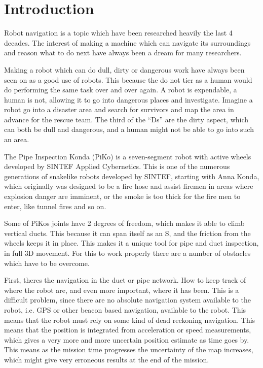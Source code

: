 
\chapter{Introduction}
Robot navigation is a topic which have been researched heavily the last 4 decades. The
interest of making a machine which can navigate its surroundings and reason what to do
next have always been a dream for many researchers. 

Making a robot which can do dull, dirty  or dangerous work have always been seen on as a
good use of robots. This because the do not tier as a human would do performing the same
task over and over again. A robot is expendable, a human is not, allowing it to go into
dangerous places and investigate. Imagine a robot go into a disaster area and search for
survivors and map the area in advance for the rescue team. The third of the ``Ds'' are the
dirty aspect, which can both be dull and dangerous, and a human might not be able to go
into such an area. 

The Pipe Inspection Konda (PiKo) is a seven-segment robot with active wheels developed by
SINTEF Applied Cybernetics. This is one of the numerous generations of snakelike robots
developed by SINTEF, starting with Anna Konda, which originally was designed to be a fire
hose and assist firemen in areas where explosion danger are imminent, or the smoke is too
thick for the fire men to enter, like tunnel fires and so on. 

Some of PiKos joints have 2 degrees of freedom, which makes it able to climb vertical ducts. This
because it can span itself as an S, and the friction from the wheels keeps it in place.
This makes it a unique tool for pipe and duct inspection, in full 3D movement. 
For this to work properly there are a number of obstacles which have to be overcome. 

First, theres the navigation in the duct or pipe network. How to keep track of where the robot
are, and even more important, where it has been. This is a difficult problem, since there
are no absolute navigation system available to the robot, i.e. GPS or other beacon based
navigation, available to the robot. This means that the robot must rely on some kind of
dead reckoning navigation. This means that the position is integrated from acceleration or
speed measurements, which gives a very more and more uncertain position estimate as time
goes by. This means as the mission time progresses the uncertainty of the map increases,
which might give very erroneous results at the end of the mission.

